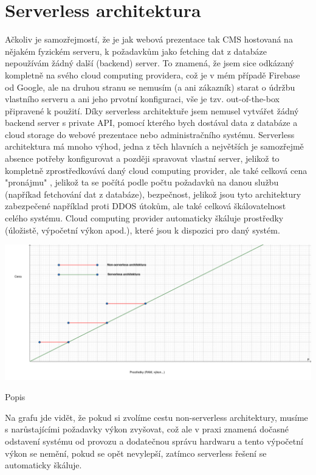 \documentclass[12pt,a4paper]{report}
\begin{document}
  \section{Serverless architektura}
  Ačkoliv je samozřejmostí, že je jak webová prezentace tak CMS hostovaná na nějakém fyzickém
  serveru, k požadavkům jako fetching dat z databáze nepoužívám žádný další (backend) server. To
  znamená, že jsem sice odkázaný kompletně na svého cloud computing providera, což je v mém
  případě Firebase od Google, ale na druhou stranu se nemusím (a ani zákazník) starat o údržbu
  vlastního serveru a ani jeho prvotní konfiguraci, vše je tzv. out-of-the-box připravené k použití.
  Díky serverless architektuře jsem nemusel vytvářet žádný backend server s private API, pomocí
  kterého bych dostával data z databáze a cloud storage do webové prezentace nebo
  administračního systému.
  Serverless architektura má mnoho výhod, jedna z těch hlavních a největších je samozřejmě
  absence potřeby konfigurovat a později spravovat vlastní server, jelikož to kompletně
  zprostředkovává daný cloud computing provider, ale také celková cena "pronájmu" , jelikož ta se
  počítá podle počtu požadavků na danou službu (napříkad fetchování dat z databáze), bezpečnost,
  jelikož jsou tyto architektury zabezpečené například proti DDOS útokům, ale také celková
  škálovatelnost celého systému. Cloud computing provider automaticky škáluje prostředky (úložistě,
  výpočetní výkon apod.), které jsou k dispozici pro daný systém.

  \vspace*{0.5cm}
  \noindent\includegraphics[width=\linewidth]{non-vs-serverless.png}
  \begin{center}
    Popis
  \end{center}
  \vspace*{0.5cm}
  Na grafu jde vidět, že pokud si zvolíme cestu non-serverless architektury, musíme s narůstajícími
  požadavky výkon zvyšovat, což ale v praxi znamená dočasné odstavení systému od provozu a
  dodatečnou správu hardwaru a tento výpočetní výkon se nemění, pokud se opět nevylepší,
  zatímco serverless řešení se automaticky škáluje.
  
\end{document}
